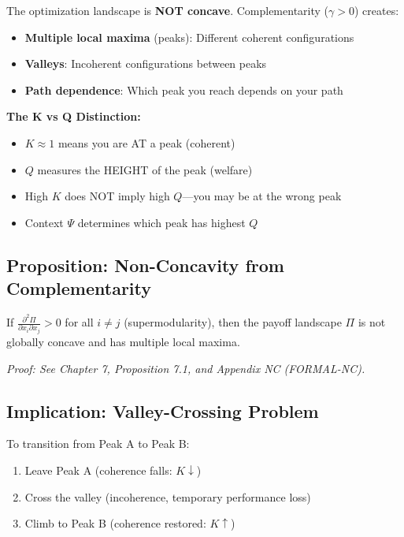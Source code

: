 \begin{tcolorbox}[colback=orange!5!white, colframe=orange!75!black,
    title=\textbf{Critical: Non-Concavity and Multiple Equilibria}]

The optimization landscape is \textbf{NOT concave}. Complementarity ($\gamma > 0$) creates:

\begin{itemize}
\item \textbf{Multiple local maxima} (peaks): Different coherent configurations
\item \textbf{Valleys}: Incoherent configurations between peaks
\item \textbf{Path dependence}: Which peak you reach depends on your path
\end{itemize}

\textbf{The K vs Q Distinction:}
\begin{itemize}
\item $K \approx 1$ means you are AT a peak (coherent)
\item $Q$ measures the HEIGHT of the peak (welfare)
\item High $K$ does NOT imply high $Q$---you may be at the wrong peak
\item Context $\Psi$ determines which peak has highest $Q$
\end{itemize}

\end{tcolorbox}

\subsection{Proposition: Non-Concavity from Complementarity}

\begin{proposition}
If $\frac{\partial^2 \Pi}{\partial x_i \partial x_j} > 0$ for all $i \neq j$ (supermodularity),
then the payoff landscape $\Pi$ is not globally concave and has multiple local maxima.
\end{proposition}

\textit{Proof: See Chapter 7, Proposition 7.1, and Appendix NC (FORMAL-NC).}

\subsection{Implication: Valley-Crossing Problem}

To transition from Peak A to Peak B:
\begin{enumerate}
\item Leave Peak A (coherence falls: $K \downarrow$)
\item Cross the valley (incoherence, temporary performance loss)
\item Climb to Peak B (coherence restored: $K \uparrow$)
\end{enumerate}

